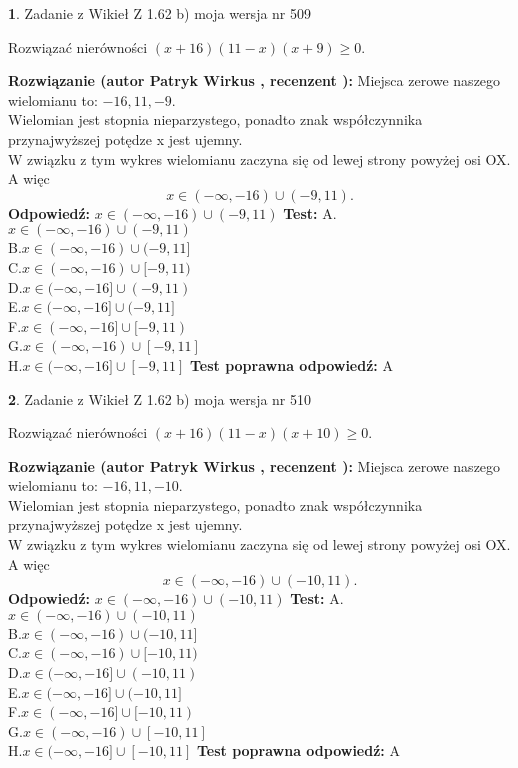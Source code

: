 \documentclass[12pt, a4paper]{article}
\theoremstyle{definition} %
\newtheorem{zad}{}
\newcommand{\zadStart}[1]{\begin{zad}#1\newline}
\newcommand{\zadStop}{\end{zad}}
\newcommand{\rozwStart}[2]{\noindent \textbf{Rozwiązanie (autor #1 , recenzent #2): }\newline}
\newcommand{\rozwStop}{\newline}
\newcommand{\odpStart}{\noindent \textbf{Odpowiedź:}\newline}
\newcommand{\odpStop}{\newline}
\newcommand{\testStart}{\noindent \textbf{Test:}\newline}
\newcommand{\testStop}{\newline}
\newcommand{\kluczStart}{\noindent \textbf{Test poprawna odpowiedź:}\newline}
\newcommand{\kluczStop}{\newline}
\begin{document}
\zadStart{Zadanie z Wikieł Z 1.62 b) moja wersja nr 509}

Rozwiązać nierówności $(x+16)(11-x)(x+9)\ge0$.
\zadStop
\rozwStart{Patryk Wirkus}{}
Miejsca zerowe naszego wielomianu to: $-16, 11, -9$.\\
Wielomian jest stopnia nieparzystego, ponadto znak współczynnika przy\linebreak najwyższej potędze x jest ujemny.\\ W związku z tym wykres wielomianu zaczyna się od lewej strony powyżej osi OX. A więc $$x \in (-\infty,-16) \cup (-9,11).$$
\rozwStop
\odpStart
$x \in (-\infty,-16) \cup (-9,11)$
\odpStop
\testStart
A.$x \in (-\infty,-16) \cup (-9,11)$\\
B.$x \in (-\infty,-16) \cup (-9,11]$\\
C.$x \in (-\infty,-16) \cup [-9,11)$\\
D.$x \in (-\infty,-16] \cup (-9,11)$\\
E.$x \in (-\infty,-16] \cup (-9,11]$\\
F.$x \in (-\infty,-16] \cup [-9,11)$\\
G.$x \in (-\infty,-16) \cup [-9,11]$\\
H.$x \in (-\infty,-16] \cup [-9,11]$
\testStop
\kluczStart
A
\kluczStop



\zadStart{Zadanie z Wikieł Z 1.62 b) moja wersja nr 510}

Rozwiązać nierówności $(x+16)(11-x)(x+10)\ge0$.
\zadStop
\rozwStart{Patryk Wirkus}{}
Miejsca zerowe naszego wielomianu to: $-16, 11, -10$.\\
Wielomian jest stopnia nieparzystego, ponadto znak współczynnika przy\linebreak najwyższej potędze x jest ujemny.\\ W związku z tym wykres wielomianu zaczyna się od lewej strony powyżej osi OX. A więc $$x \in (-\infty,-16) \cup (-10,11).$$
\rozwStop
\odpStart
$x \in (-\infty,-16) \cup (-10,11)$
\odpStop
\testStart
A.$x \in (-\infty,-16) \cup (-10,11)$\\
B.$x \in (-\infty,-16) \cup (-10,11]$\\
C.$x \in (-\infty,-16) \cup [-10,11)$\\
D.$x \in (-\infty,-16] \cup (-10,11)$\\
E.$x \in (-\infty,-16] \cup (-10,11]$\\
F.$x \in (-\infty,-16] \cup [-10,11)$\\
G.$x \in (-\infty,-16) \cup [-10,11]$\\
H.$x \in (-\infty,-16] \cup [-10,11]$
\testStop
\kluczStart
A
\kluczStop
\end{document}
